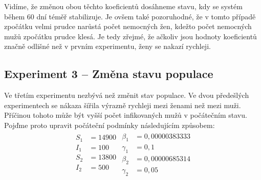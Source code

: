 \documentclass{article}
\begin{document}
Vidíme, že změnou obou těchto koeficientů dosáhneme stavu, kdy se systém během 60 dní téměř stabilizuje. Je ovšem také pozoruhodné, že v tomto případě zpočátku velmi prudce narůstá počet nemocných žen, kdežto počet nemocných mužů zpočátku prudce klesá. Je tedy zřejmé, že ačkoliv jsou hodnoty koeficientů značně odlišné než v prvním experimentu, ženy se nakazí rychleji.
\newpage

\subsection{Experiment 3 -- Změna stavu populace}
Ve třetím experimentu nezbývá než změnit stav populace. Ve dvou předešlých experimentech se nákaza šířila výrazně rychleji mezi ženami než mezi muži. Příčinou tohoto může být vyšší počet infikovaných mužů v počátečním stavu. Pojďme proto upravit počáteční podmínky následujícím způsobem:
\begin{align}
\begin{split}
    S_1&=14900\\
    I_1&=100\\
    S_2&=13800\\
    I_2&=500\\
\end{split}
\begin{split}
    \beta_1&=0,00000383333\\
    \gamma_1&=0,1\\
    \beta_2&=0,00000685314\\
    \gamma_2&=0,05\nonumber
\end{split}
\end{align}
\end{document}
